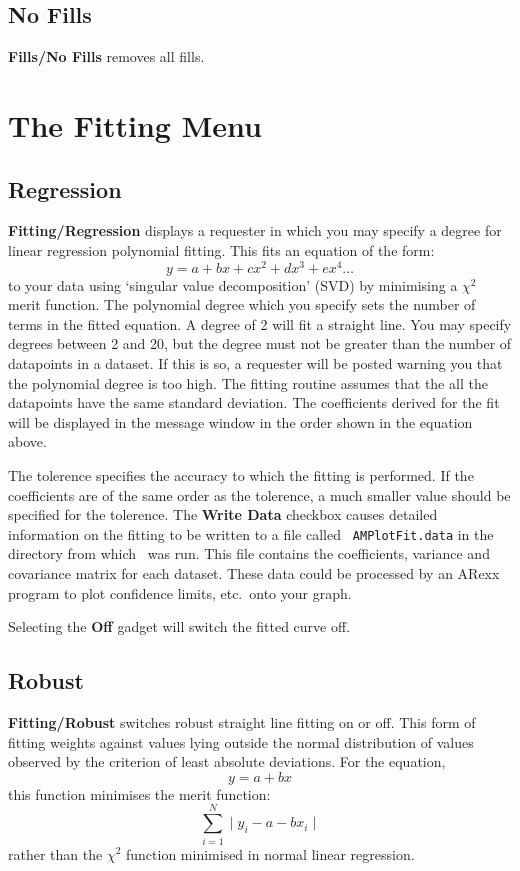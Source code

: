 \subsection{No Fills}
{\bf Fills/No Fills} removes all fills.

\section{The Fitting Menu}


\subsection{Regression}
{\bf Fitting/Regression}  displays a requester in 
which you may specify a degree for linear regression polynomial fitting. 
This fits an equation of the form:
$$y=a+bx+cx^2+dx^3+ex^4\ldots$$
to your data using `singular value decomposition' (SVD) by minimising a $\chi^2$ 
merit function.
The polynomial degree which you specify sets the number of terms in 
the fitted equation. A degree of 2 will fit a straight line. You may specify 
degrees between 2 and 20, but the degree must not be greater than the number of 
datapoints in a dataset. If this is so, a requester will be posted warning you that 
the polynomial degree is too high.
The fitting routine assumes that the all the datapoints have the same
standard deviation. The coefficients derived for the fit will be displayed in the
message window in the order shown in the equation above.

The tolerence specifies the accuracy to which the fitting is performed. If 
the coefficients are of the same order as the tolerence, a much smaller 
value should be specified for the tolerence. The {\bf Write Data} checkbox 
causes detailed information on the fitting to be written to a file called 
{\tt
AMPlotFit.data} in the directory from which \amplot\ was run. This file contains the 
coefficients, variance and covariance matrix for each dataset. These data could be 
processed by an ARexx program to plot confidence limits, etc.\ onto your graph.

Selecting the {\bf Off} gadget will switch the fitted curve off.



\subsection{Robust}
{\bf Fitting/Robust} switches 
robust straight line fitting on or off. This form of 
fitting weights against values lying outside the normal distribution of values 
observed by the criterion of least absolute deviations. 
For the equation,
$$y = a + bx$$
this function minimises the merit function:
$$\sum_{i=1}^{N}\mid y_i-a-bx_i\mid$$
rather than the $\chi^2$ function minimised in normal linear regression.


